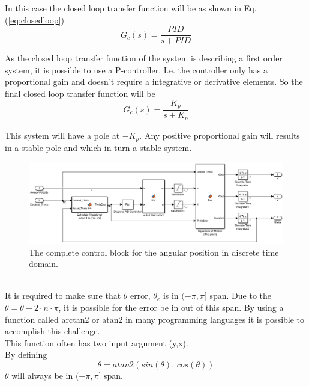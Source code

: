 In this case the closed loop transfer function will be as shown in Eq.(\ref{eq:closedloop})
\begin{equation}
G_{c}(s) = \frac{PID}{s + PID}
\label{eq:closedloop}
\end{equation} 

As the closed loop transfer function of the system is describing a first order system, it is possible to use a P-controller. 
I.e. the controller only has a proportional gain and doesn't require a integrative or derivative elements. 
So the final closed loop transfer function will be 
\begin{equation}
G_{c}(s) = \frac{K_p}{s + K_p}
\label{eq:kp}
\end{equation}

This system will have a pole at $-K_p$.
Any positive proportional gain will results in a stable pole and which in turn a stable system. \\
\begin{figure}[ht]
\centering
\includegraphics[width=\textwidth]{sections/assets/Theta_PID.PNG}
\caption{The complete control block for the angular position in discrete time domain.}
\label{fig:PID1}
\end{figure}
\\
 
It is required to make sure that $\theta$ error, $\theta_e$ is in $(-\pi,\pi]$ span. Due to the $\theta = \theta \pm 2 \cdot n \cdot \pi$, it is possible for the error be in out of this span.
By using a function called arctan2 or atan2 in many programming languages it is possible to accomplish this challenge.\\
This function often has two input argument (y,x).\\ 
By defining 
\begin{equation}
\theta = atan2(sin(\theta),\, cos(\theta))
\end{equation}
$\theta$ will always be in $(-\pi,\pi]$ span.\\

